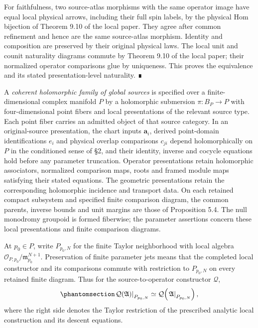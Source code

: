 \documentclass[
  english,
  11pt,
  reqno]{amsart}
\begin{document}
For faithfulness, two source-atlas morphisms with the same operator
image have equal local physical arrows, including their full spin
labels, by the physical Hom bijection of Theorem 9.10 of the local
paper. They agree after common refinement and hence are the same
source-atlas morphism. Identity and composition are preserved by their
original physical laws. The local unit and counit naturality diagrams
commute by Theorem 9.10 of the local paper; their normalized operator
comparisons glue by uniqueness. This proves the equivalence and its
stated presentation-level naturality. ∎

\protect{}\label{def:conditioned-holomorphic-source-families}

A \emph{coherent holomorphic family of global sources} is specified over
a finite-dimensional complex manifold \(P\) by a holomorphic submersion
\(\pi:B_P\to P\) with four-dimensional point fibers and local
presentations of the relevant source type. Each point fiber carries an
admitted object of that source category. In an original-source
presentation, the chart inputs \(\mathbf a_i\), derived point-domain
identifications \(e_i\) and physical overlap comparisons \(c_{ji}\)
depend holomorphically on \(P\) in the conditioned sense of §2, and
their identity, inverse and cocycle equations hold before any parameter
truncation. Operator presentations retain holomorphic associators,
normalized comparison maps, roots and framed module maps satisfying
their stated equations. The geometric presentations retain the
corresponding holomorphic incidence and transport data. On each retained
compact subsystem and specified finite comparison diagram, the common
parents, inverse bounds and unit margins are those of Proposition 5.4.
The null monodromy groupoid is formed fiberwise; the parameter
assertions concern these local presentations and finite comparison
diagrams.

At \(p_0\in P\), write \(P_{p_0,N}\) for the finite Taylor neighborhood
with local algebra \(\mathcal O_{P,p_0}/\mathfrak m_{p_0}^{N+1}\).
Preservation of finite parameter jets means that the completed local
constructor and its comparisons commute with restriction to
\(P_{p_0,N}\) on every retained finite diagram. Thus for the
source-to-operator constructor \(\mathcal Q\),
\begin{equation}\protect\phantomsection\label{eq:source-family-finite-jet-base-change}{
\left.\mathcal Q(\mathfrak A)\right|_{P_{p_0,N}}
\simeq
\mathcal Q\!\left(\left.\mathfrak A\right|_{P_{p_0,N}}\right),
}\end{equation} where the right side denotes the Taylor restriction of
the prescribed analytic local construction and its descent equations.
\end{document}
